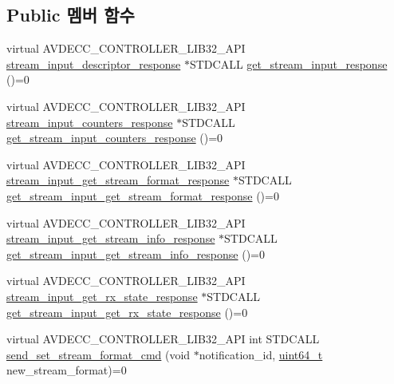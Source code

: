 \subsection*{Public 멤버 함수}
\begin{DoxyCompactItemize}
\item 
virtual A\+V\+D\+E\+C\+C\+\_\+\+C\+O\+N\+T\+R\+O\+L\+L\+E\+R\+\_\+\+L\+I\+B32\+\_\+\+A\+PI \hyperlink{classavdecc__lib_1_1stream__input__descriptor__response}{stream\+\_\+input\+\_\+descriptor\+\_\+response} $\ast$S\+T\+D\+C\+A\+LL \hyperlink{classavdecc__lib_1_1stream__input__descriptor_a1be36084f46cee6b34b31b75e7667cc6}{get\+\_\+stream\+\_\+input\+\_\+response} ()=0
\item 
virtual A\+V\+D\+E\+C\+C\+\_\+\+C\+O\+N\+T\+R\+O\+L\+L\+E\+R\+\_\+\+L\+I\+B32\+\_\+\+A\+PI \hyperlink{classavdecc__lib_1_1stream__input__counters__response}{stream\+\_\+input\+\_\+counters\+\_\+response} $\ast$S\+T\+D\+C\+A\+LL \hyperlink{classavdecc__lib_1_1stream__input__descriptor_a7b540863a150eeb6ba2db06ee16ae0ce}{get\+\_\+stream\+\_\+input\+\_\+counters\+\_\+response} ()=0
\item 
virtual A\+V\+D\+E\+C\+C\+\_\+\+C\+O\+N\+T\+R\+O\+L\+L\+E\+R\+\_\+\+L\+I\+B32\+\_\+\+A\+PI \hyperlink{classavdecc__lib_1_1stream__input__get__stream__format__response}{stream\+\_\+input\+\_\+get\+\_\+stream\+\_\+format\+\_\+response} $\ast$S\+T\+D\+C\+A\+LL \hyperlink{classavdecc__lib_1_1stream__input__descriptor_a5936825ba5c5fb6181218bec80cafce5}{get\+\_\+stream\+\_\+input\+\_\+get\+\_\+stream\+\_\+format\+\_\+response} ()=0
\item 
virtual A\+V\+D\+E\+C\+C\+\_\+\+C\+O\+N\+T\+R\+O\+L\+L\+E\+R\+\_\+\+L\+I\+B32\+\_\+\+A\+PI \hyperlink{classavdecc__lib_1_1stream__input__get__stream__info__response}{stream\+\_\+input\+\_\+get\+\_\+stream\+\_\+info\+\_\+response} $\ast$S\+T\+D\+C\+A\+LL \hyperlink{classavdecc__lib_1_1stream__input__descriptor_a92a813816ec8dc069c9fb42909eb0ace}{get\+\_\+stream\+\_\+input\+\_\+get\+\_\+stream\+\_\+info\+\_\+response} ()=0
\item 
virtual A\+V\+D\+E\+C\+C\+\_\+\+C\+O\+N\+T\+R\+O\+L\+L\+E\+R\+\_\+\+L\+I\+B32\+\_\+\+A\+PI \hyperlink{classavdecc__lib_1_1stream__input__get__rx__state__response}{stream\+\_\+input\+\_\+get\+\_\+rx\+\_\+state\+\_\+response} $\ast$S\+T\+D\+C\+A\+LL \hyperlink{classavdecc__lib_1_1stream__input__descriptor_a16a103984d891491a224e518ace35b06}{get\+\_\+stream\+\_\+input\+\_\+get\+\_\+rx\+\_\+state\+\_\+response} ()=0
\item 
virtual A\+V\+D\+E\+C\+C\+\_\+\+C\+O\+N\+T\+R\+O\+L\+L\+E\+R\+\_\+\+L\+I\+B32\+\_\+\+A\+PI int S\+T\+D\+C\+A\+LL \hyperlink{classavdecc__lib_1_1stream__input__descriptor_a7407f2ca9a5a63a404e5f96ccdbf31f3}{send\+\_\+set\+\_\+stream\+\_\+format\+\_\+cmd} (void $\ast$notification\+\_\+id, \hyperlink{parse_8c_aec6fcb673ff035718c238c8c9d544c47}{uint64\+\_\+t} new\+\_\+stream\+\_\+format)=0

\end{DoxyCompactItemize}
